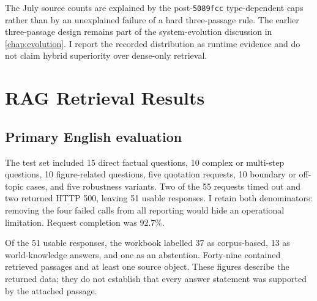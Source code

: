 The July source counts are explained by the post-\texttt{5089fcc} type-dependent caps rather than by an unexplained failure of a hard three-passage rule. The earlier three-passage design remains part of the system-evolution discussion in \cref{chap:evolution}. I report the recorded distribution as runtime evidence and do not claim hybrid superiority over dense-only retrieval.

\section{RAG Retrieval Results}
\label{sec:rag-retrieval-results}

\subsection{Primary English evaluation}
\label{subsec:english-rag-run}

The test set included 15 direct factual questions, 10 complex or multi-step questions, 10 figure-related questions, five quotation requests, 10 boundary or off-topic cases, and five robustness variants. Two of the 55 requests timed out and two returned HTTP 500, leaving 51 usable responses. I retain both denominators: removing the four failed calls from all reporting would hide an operational limitation. Request completion was 92.7\%.

Of the 51 usable responses, the workbook labelled 37 as corpus-based, 13 as world-knowledge answers, and one as an abstention. Forty-nine contained retrieved passages and at least one source object. These figures describe the returned data; they do not establish that every answer statement was supported by the attached passage.

